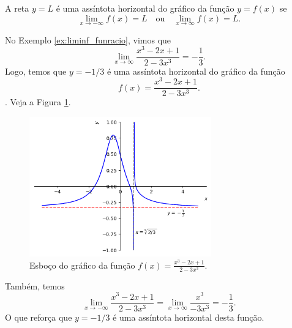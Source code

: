 A reta $y = L$ é uma assíntota horizontal do gráfico da função $y = f(x)$ se
\begin{equation}
  \lim_{x\to -\infty} f(x) = L\quad\text{ou}\quad\lim_{x\to\infty} f(x) = L.
\end{equation}

\begin{ex}\label{ex:ass_hor}
  No Exemplo \ref{ex:liminf_funracio}, vimos que
  \begin{equation}
    \lim_{x\to\infty} \frac{x^3 - 2x + 1}{2 - 3x^3} = -\frac{1}{3}.
  \end{equation}
  Logo, temos que $y=-1/3$ é uma assíntota horizontal do gráfico da função
  \begin{equation}
    f(x) = \frac{x^3 - 2x + 1}{2 - 3x^3}.
  \end{equation}
  . Veja a Figura \ref{fig:ex_ass_horizon}.

      \begin{figure}[H]
      \centering
      \includegraphics[width=0.7\textwidth]{./cap_lim/dados/fig_ex_ass_horizon/fig_ex_ass_horizon}
      \caption{Esboço do gráfico da função $\displaystyle f(x) = \frac{x^3 - 2x + 1}{2 - 3x^3}$.}
      \label{fig:ex_ass_horizon}
    \end{figure}

  Também, temos
  \begin{equation}
    \lim_{x\to -\infty} \frac{x^3 - 2x + 1}{2 - 3x^3} = \lim_{x\to\infty} \frac{x^3}{-3x^3} = -\frac{1}{3}.
  \end{equation}
  O que reforça que $y = -1/3$ é uma assíntota horizontal desta função.
\end{ex}

